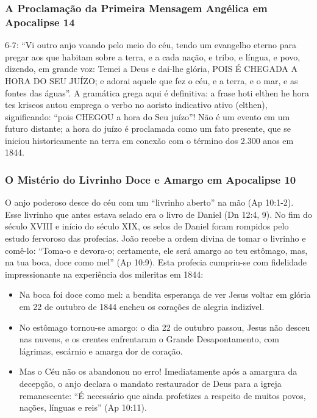 \subsubsection*{A Proclamação da Primeira Mensagem Angélica em Apocalipse 14}
6-7:
``Vi outro anjo voando pelo meio do céu, tendo um evangelho eterno para pregar aos que habitam sobre a terra, e a cada nação, e tribo, e língua, e povo, dizendo, em grande voz: Temei a Deus e dai-lhe glória, POIS É CHEGADA A HORA DO SEU JUÍZO; e adorai aquele que fez o céu, e a terra, e o mar, e as fontes das águas''.
A gramática grega aqui é definitiva: a frase hoti elthen he hora tes kriseos autou emprega o verbo no aoristo indicativo ativo (elthen), significando: ``pois CHEGOU a hora do Seu juízo''! Não é um evento em um futuro distante; a hora do juízo é proclamada como um fato presente, que se iniciou historicamente na terra em conexão com o término dos 2.300 anos em 1844.


\subsubsection*{O Mistério do Livrinho Doce e Amargo em Apocalipse 10}
O anjo poderoso desce do céu com um ``livrinho aberto'' na mão (Ap 10:1-2). Esse livrinho que antes estava selado era o livro de Daniel (Dn 12:4, 9). No fim do século XVIII e início do século XIX, os selos de Daniel foram rompidos pelo estudo fervoroso das profecias. João recebe a ordem divina de tomar o livrinho e comê-lo: ``Toma-o e devora-o; certamente, ele será amargo ao teu estômago, mas, na tua boca, doce como mel'' (Ap 10:9).
Esta profecia cumpriu-se com fidelidade impressionante na experiência dos mileritas em 1844:
\begin{itemize}
  \item Na boca foi doce como mel: a bendita esperança de ver Jesus voltar em glória em 22 de outubro de 1844 encheu os corações de alegria indizível.
  \item No estômago tornou-se amargo: o dia 22 de outubro passou, Jesus não desceu nas nuvens, e os crentes enfrentaram o Grande Desapontamento, com lágrimas, escárnio e amarga dor de coração.
  \item Mas o Céu não os abandonou no erro! Imediatamente após a amargura da decepção, o anjo declara o mandato restaurador de Deus para a igreja remanescente: ``É necessário que ainda profetizes a respeito de muitos povos, nações, línguas e reis'' (Ap 10:11).
\end{itemize}


